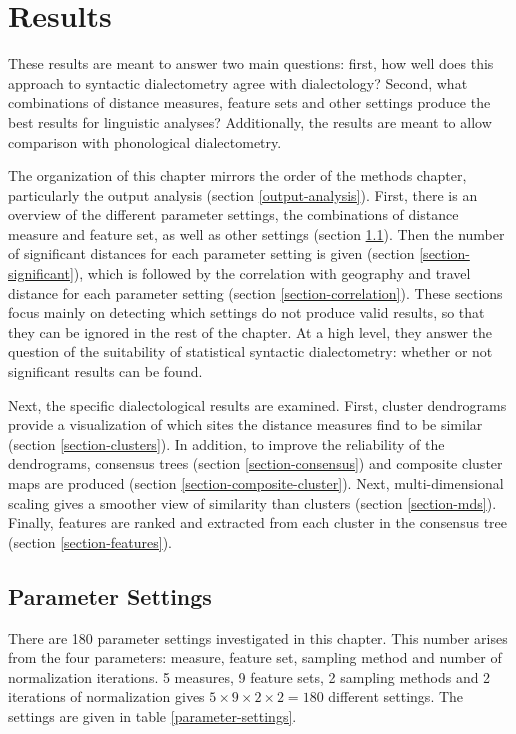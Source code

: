 \chapter{Results}
\label{results-chapter}

These results are meant to answer two main questions: first, how well does
this approach to syntactic dialectometry agree with dialectology?
Second, what combinations of distance measures, feature
sets and other settings produce the best results for linguistic
analyses? Additionally, the results are meant to allow comparison with
phonological dialectometry.

The organization of this chapter mirrors the order of the methods
chapter, particularly the output analysis (section
\ref{output-analysis}). First, there is an overview of the different
parameter settings, the combinations of distance measure and feature
set, as well as other settings (section
\ref{section-parameter-settings}). Then the number of significant
distances for each parameter setting is given (section
\ref{section-significant}), which is followed by the correlation with
geography and travel distance for each parameter setting (section
\ref{section-correlation}). These sections focus mainly on detecting
which settings do not produce valid results, so that they can be
ignored in the rest of the chapter. At a high level, they answer the
question of the suitability of statistical syntactic dialectometry:
whether or not significant results can be found.

Next, the specific dialectological results are examined. First,
cluster dendrograms provide a visualization of which sites the
distance measures find to be similar (section
\ref{section-clusters}). In addition, to improve the reliability of
the dendrograms, consensus trees (section \ref{section-consensus}) and
composite cluster maps are produced (section
\ref{section-composite-cluster}). Next, multi-dimensional scaling
gives a smoother view of similarity than clusters (section
\ref{section-mds}). Finally, features are ranked and extracted from
each cluster in the consensus tree (section \ref{section-features}).

\section{Parameter Settings}
\label{section-parameter-settings}

There are 180 parameter settings investigated in this chapter. This
number arises from the four parameters: measure, feature set, sampling
method and number of normalization iterations. 5 measures, 9 feature
sets, 2 sampling methods and 2 iterations of normalization
gives $5\times 9 \times 2 \times 2=180$ different settings. The
settings are given in table \ref{parameter-settings}.

